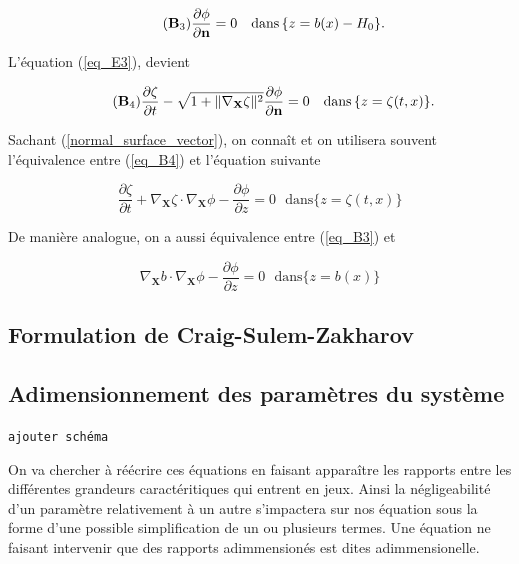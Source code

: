 \documentclass[12pt,a4paper]{article}
\numberwithin{equation}{section}
\begin{document}
\begin{equation} \tag{$\textbf{B}_3$} \label{eq_B3}
    \frac{\partial \phi}{\partial \textbf{n}} = 0 ~~~ \text{dans}\,\{z = b(x)-H_0\} .
\end{equation}

L'équation (\ref{eq_E3}), devient

\begin{equation} \tag{$\textbf{B}_4$} \label{eq_B4}
\frac{\partial \zeta}{\partial t}  - \sqrt{1+ \| \nabla_\textbf{X}\zeta\|^2}\frac{\partial \phi}{\partial\textbf{n}} = 0~~~\text{dans}\,\{z = \zeta(t,x)\} .
\end{equation}

Sachant (\ref{normal_surface_vector}), on connaît et on utilisera souvent l'équivalence entre (\ref{eq_B4}) et l'équation suivante


\begin{equation} \label{eq_B4_bis}
    \frac{\partial \zeta}{\partial t}  + \nabla_\textbf{X}\zeta\cdot\nabla_\textbf{X}\phi - \frac{\partial\phi}{\partial z} = 0 ~~~\text{dans}\{z = \zeta(t,x)\} 
\end{equation}

De manière analogue, on a aussi équivalence entre (\ref{eq_B3}) et 

\begin{equation} \label{eq_B3_bis}
    \nabla_\textbf{X}b\cdot\nabla_\textbf{X}\phi - \frac{\partial\phi}{\partial z} = 0 ~~~\text{dans}\{z = b(x)\} 
\end{equation}



\subsection{Formulation de Craig-Sulem-Zakharov}
\subsection{Adimensionnement des paramètres du système}

\begin{center}
    \texttt{ajouter schéma}
\end{center}

On va chercher à réécrire ces équations en faisant apparaître les rapports entre les différentes grandeurs caractéritiques qui entrent en jeux. Ainsi la négligeabilité d'un paramètre relativement à un autre s'impactera sur nos équation sous la forme d'une possible simplification de un ou plusieurs termes. Une équation ne faisant intervenir que des rapports adimmensionés est dites adimmensionelle. 
\\
\end{document}
